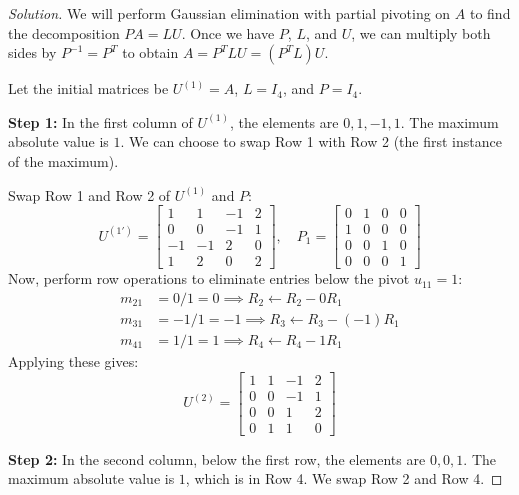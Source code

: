 \documentclass[11pt, a4paper]{article}
\newif\ifsolutionnewpage
\newenvironment{solution}
  {\begin{proof}[Solution]}
  {\end{proof}\ifsolutionnewpage\newpage\fi}
\begin{document}
\begin{solution}
    We will perform Gaussian elimination with partial pivoting on $A$ to find the decomposition $PA = LU$. Once we have $P$, $L$, and $U$, we can multiply both sides by $P^{-1} = P^T$ to obtain $A = P^T LU = (P^T L)U$.

    Let the initial matrices be $U^{(1)} = A$, $L = I_4$, and $P = I_4$.

    \textbf{Step 1:}
    In the first column of $U^{(1)}$, the elements are $0, 1, -1, 1$. The maximum absolute value is $1$. We can choose to swap Row 1 with Row 2 (the first instance of the maximum). 
    
    Swap Row 1 and Row 2 of $U^{(1)}$ and $P$:
    \[
    U^{(1')} = \begin{bmatrix} 1&1&-1&2 \\ 0&0&-1&1 \\ -1&-1&2&0 \\ 1&2&0&2 \end{bmatrix}, \quad
    P_1 = \begin{bmatrix} 0&1&0&0 \\ 1&0&0&0 \\ 0&0&1&0 \\ 0&0&0&1 \end{bmatrix}
    \]
    Now, perform row operations to eliminate entries below the pivot $u_{11} = 1$:
    \begin{align*}
        m_{21} &= 0/1 = 0 \implies R_2 \leftarrow R_2 - 0 R_1 \\
        m_{31} &= -1/1 = -1 \implies R_3 \leftarrow R_3 - (-1) R_1 \\
        m_{41} &= 1/1 = 1 \implies R_4 \leftarrow R_4 - 1 R_1 
    \end{align*}
    Applying these gives:
    \[
    U^{(2)} = \begin{bmatrix} 1&1&-1&2 \\ 0&0&-1&1 \\ 0&0&1&2 \\ 0&1&1&0 \end{bmatrix}
    \]

    \textbf{Step 2:}
    In the second column, below the first row, the elements are $0, 0, 1$. The maximum absolute value is $1$, which is in Row 4. We swap Row 2 and Row 4.
    

\end{solution}
\end{document}
